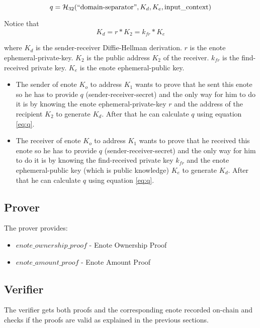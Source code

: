\documentclass[usletter,11pt,english,oneside,onecolumn,final,openany]{report}
\begin{document}
\begin{equation}
q = \mathcal{H}_{32}(``\text{domain-separator}", K_d, K_e, \text{input\_context}) 
\label{eq:q}
\end{equation}

Notice that 
\begin{equation}
    K_d = r * K_2 = k_{fr} * K_e 
\label{eq:Kd}
\end{equation}

where $K_d$ is the sender-receiver Diffie-Hellman derivation. $r$ is the enote ephemeral-private-key. $K_2$ is the public address $K_2$ of the receiver. $k_{fr}$ is the find-received private key. $K_e$ is the enote ephemeral-public key. 


\begin{itemize}
    \item The sender of enote $K_{o}$ to address $K_1$ wants to prove that he sent this enote so he has to provide $q$ (sender-receiver-secret) and the only way for him to do it is by knowing the enote ephemeral-private-key $r$ and the address of the recipient $K_2$ to generate $K_d$. After that he can calculate $q$ using equation \ref{eq:q}.
    \item The receiver of enote $K_{o}$ to address $K_1$ wants to prove that he received this enote so he has to provide $q$ (sender-receiver-secret) and the only way for him to do it is by knowing the find-received private key $k_{fr}$ and the enote ephemeral-public key (which is public knowledge) $K_e$ to generate $K_d$. After that he can calculate $q$ using equation \ref{eq:q}.
\end{itemize}

\subsection{Prover}

The prover provides:
	
\begin{itemize}
\item $enote\_ownership\_proof$ - Enote Ownership Proof
\item $enote\_amount\_proof$ - Enote Amount Proof
\end{itemize}

\subsection{Verifier}

The verifier gets both proofs and the corresponding enote recorded on-chain and checks if the proofs are valid as explained in the previous sections.
\end{document}
